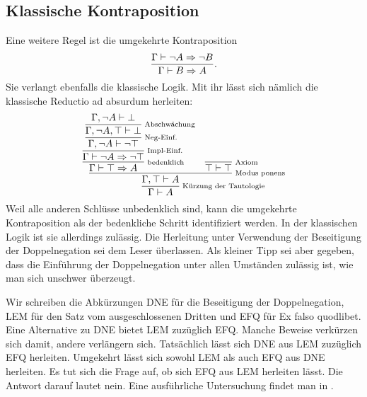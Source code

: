 \subsection{Klassische Kontraposition}

Eine weitere Regel ist die umgekehrte Kontraposition
\[\dfrac{\Gamma\vdash\lnot A\Rightarrow\lnot B}{\Gamma\vdash B\Rightarrow A}.\]
Sie verlangt ebenfalls die klassische Logik. Mit ihr lässt sich
nämlich die klassische Reductio ad absurdum herleiten:
\[
\infer[\infernote{Kürzung der Tautologie}]{\Gamma\vdash A}{
  \infer[\infernote{Modus ponens}]{\Gamma,\top\vdash A}{
    \infer[\infernote{bedenklich}]{\Gamma\vdash\top\cond A}{
      \infer[\infernote{Impl-Einf.}]{\Gamma\vdash\lnot A\cond\lnot\top}{
        \infer[\infernote{Neg-Einf.}]{\Gamma,\lnot A\vdash\lnot\top}{
          \infer[\infernote{Abschwächung}]{\Gamma,\lnot A,\top\vdash\bot}{
            \Gamma,\lnot A\vdash\bot}}}}
  & \infer[\infernote{Axiom}]{\top\vdash\top}{}}}
\]
Weil alle anderen Schlüsse unbedenklich sind, kann die umgekehrte
Kontraposition als der bedenkliche Schritt identifiziert werden.
In der klassischen Logik ist sie allerdings zulässig. Die Herleitung
unter Verwendung der Beseitigung der Doppelnegation sei dem Leser
überlassen. Als kleiner Tipp sei aber gegeben, dass die Einführung
der Doppelnegation unter allen Umständen zulässig ist, wie man sich
unschwer überzeugt.

Wir schreiben die Abkürzungen DNE für die Beseitigung der
Doppelnegation, LEM für den Satz vom ausgeschlossenen Dritten
und EFQ für Ex falso quodlibet. Eine Alternative zu DNE bietet
LEM zuzüglich EFQ. Manche Beweise verkürzen sich damit, andere
verlängern sich. Tatsächlich lässt sich DNE aus LEM zuzüglich EFQ
herleiten. Umgekehrt lässt sich sowohl LEM als auch EFQ aus DNE
herleiten. Es tut sich die Frage auf, ob sich EFQ aus LEM herleiten
lässt. Die Antwort darauf lautet nein. Eine ausführliche Untersuchung
findet man in \cite{Diener}.

